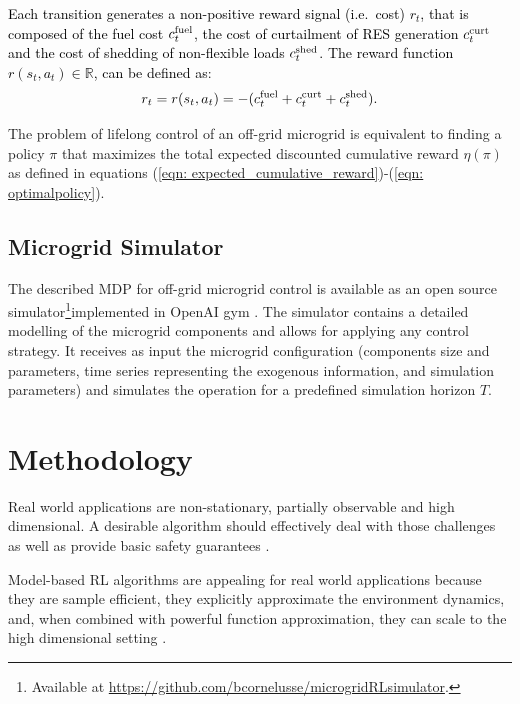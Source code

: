 \documentclass{article}
\begin{document}
    \textcolor{black}{Each transition generates a non-positive reward signal (i.e.~cost) $r_t$, that is composed of the fuel cost $c^\text{fuel}_t$, the cost of curtailment of RES generation $c^\text{curt}_t$ and the cost of shedding of non-flexible loads $ c^\text{shed}_t$. The reward function $r(s_t, a_t) \in \mathbb{R}$, can be defined as}:
    \begin{gather}
    r_t = r(s_t, a_t) = -(c^\text{fuel}_t + c^\text{curt}_t +  c^\text{shed}_t).\label{eqn: rewardfunction}
    \end{gather}
    
     The problem of lifelong control of an off-grid microgrid is equivalent to finding a policy $\pi$ that maximizes the total expected discounted cumulative reward $\eta(\pi)$ as defined in equations (\ref{eqn: expected_cumulative_reward})-(\ref{eqn: optimalpolicy}).
     

    \subsection{Microgrid Simulator}
    The described MDP for off-grid microgrid control is available as an open source simulator\footnote{Available at \url{https://github.com/bcornelusse/microgridRLsimulator}.}implemented in OpenAI gym \cite{brockman2016openai}. The simulator contains a detailed modelling of the microgrid components and allows for applying any control strategy. It receives as input the microgrid configuration (components size and parameters, time series representing the exogenous information, and simulation parameters) and simulates the operation for a predefined simulation horizon $T$.

\section{Methodology} \label{sec: Algorithm}
        
        Real world applications are non-stationary, partially observable and high dimensional. A desirable algorithm should effectively deal with those challenges as well as provide basic safety guarantees \cite{dulac2019challenges}.
        
        Model-based RL algorithms are appealing for real world applications because they are sample efficient, they explicitly approximate the environment dynamics, and, when combined with powerful function approximation, they can scale to the high dimensional setting \cite{nagabandi2018neural}.
        
\end{document}
